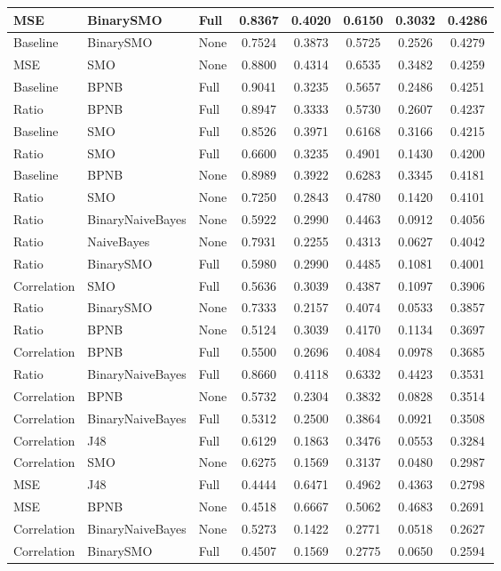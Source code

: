 {\begin{longtable}{|l|l|l|c|c|c|c|c|}
      \tabularnewline\hline
         MSE & BinarySMO & Full & 0.8367 & 0.4020 & 0.6150 & 0.3032 & 0.4286
      \tabularnewline\hline
         Baseline & BinarySMO & None & 0.7524 & 0.3873 & 0.5725 & 0.2526 & 0.4279
      \tabularnewline\hline
         MSE & SMO & None & 0.8800 & 0.4314 & 0.6535 & 0.3482 & 0.4259
      \tabularnewline\hline
         Baseline & BPNB & Full & 0.9041 & 0.3235 & 0.5657 & 0.2486 & 0.4251
      \tabularnewline\hline
         Ratio & BPNB & Full & 0.8947 & 0.3333 & 0.5730 & 0.2607 & 0.4237
      \tabularnewline\hline
         Baseline & SMO & Full & 0.8526 & 0.3971 & 0.6168 & 0.3166 & 0.4215
      \tabularnewline\hline
         Ratio & SMO & Full & 0.6600 & 0.3235 & 0.4901 & 0.1430 & 0.4200
      \tabularnewline\hline
         Baseline & BPNB & None & 0.8989 & 0.3922 & 0.6283 & 0.3345 & 0.4181
      \tabularnewline\hline
         Ratio & SMO & None & 0.7250 & 0.2843 & 0.4780 & 0.1420 & 0.4101
      \tabularnewline\hline
         Ratio & BinaryNaiveBayes & None & 0.5922 & 0.2990 & 0.4463 & 0.0912 & 0.4056
      \tabularnewline\hline
         Ratio & NaiveBayes & None & 0.7931 & 0.2255 & 0.4313 & 0.0627 & 0.4042
      \tabularnewline\hline
         Ratio & BinarySMO & Full & 0.5980 & 0.2990 & 0.4485 & 0.1081 & 0.4001
      \tabularnewline\hline
         Correlation & SMO & Full & 0.5636 & 0.3039 & 0.4387 & 0.1097 & 0.3906
      \tabularnewline\hline
         Ratio & BinarySMO & None & 0.7333 & 0.2157 & 0.4074 & 0.0533 & 0.3857
      \tabularnewline\hline
         Ratio & BPNB & None & 0.5124 & 0.3039 & 0.4170 & 0.1134 & 0.3697
      \tabularnewline\hline
         Correlation & BPNB & Full & 0.5500 & 0.2696 & 0.4084 & 0.0978 & 0.3685
      \tabularnewline\hline
         Ratio & BinaryNaiveBayes & Full & 0.8660 & 0.4118 & 0.6332 & 0.4423 & 0.3531
      \tabularnewline\hline
         Correlation & BPNB & None & 0.5732 & 0.2304 & 0.3832 & 0.0828 & 0.3514
      \tabularnewline\hline
         Correlation & BinaryNaiveBayes & Full & 0.5312 & 0.2500 & 0.3864 & 0.0921 & 0.3508
      \tabularnewline\hline
         Correlation & J48 & Full & 0.6129 & 0.1863 & 0.3476 & 0.0553 & 0.3284
      \tabularnewline\hline
         Correlation & SMO & None & 0.6275 & 0.1569 & 0.3137 & 0.0480 & 0.2987
      \tabularnewline\hline
         MSE & J48 & Full & 0.4444 & 0.6471 & 0.4962 & 0.4363 & 0.2798
      \tabularnewline\hline
         MSE & BPNB & None & 0.4518 & 0.6667 & 0.5062 & 0.4683 & 0.2691
      \tabularnewline\hline
         Correlation & BinaryNaiveBayes & None & 0.5273 & 0.1422 & 0.2771 & 0.0518 & 0.2627
      \tabularnewline\hline
         Correlation & BinarySMO & Full & 0.4507 & 0.1569 & 0.2775 & 0.0650 & 0.2594

\end{longtable}}
